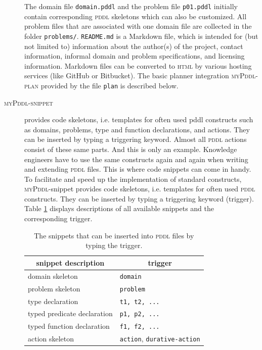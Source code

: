 \documentclass[runningheads]{llncs}
\newcommand{\tableheadline}[1]{\multicolumn{1}{c}{#1}}
\newcommand{\mypddl}{\textsc{myPddl}\xspace}
\newcommand{\mypddlsnippet}{\textsc{myPddl-snippet}\xspace}
\newcommand{\mypddlplan}{\textsc{myPddl-plan}\xspace}
\newcommand{\pddl}{\textsc{pddl}\xspace}
\begin{document}
\begin{description}
\begin{figure}[h] 
\end{figure}

The domain file \texttt{domain.pddl} and the problem file
\texttt{p01.pddl} initially contain corresponding \pddl skeletons
which can also be customized. All problem files that are associated
with one domain file are collected in the folder
\texttt{problems/}. \texttt{README.md} is a Markdown file, which is
intended for (but not limited to) information about the author(s) of
the project, contact information, informal domain and problem
specifications, and licensing information.  Markdown files can be
converted to \textsc{html} by various hosting services (like GitHub or
Bitbucket). The basic planner integration \mypddlplan provided by the
file \texttt{plan} is described below.

\item[\mypddlsnippet] provides code skeletons, i.e. templates for
  often used pddl constructs such as domains, problems, type and
  function declarations, and actions. They can be inserted by typing a
  triggering keyword. Almost all \pddl actions consist of these same parts. And this is only
an example. Knowledge engineers have to use the same constructs again
and again when writing and extending \pddl files. This is where code
snippets can come in handy. To facilitate and speed up the implementation of
standard constructs, \mypddl-snippet provides code skeletons, i.e.
templates for often used \pddl constructs. They can be inserted by
typing a triggering keyword (trigger). Table \ref{tab:snippets}
displays descriptions of all available snippets and the corresponding
trigger.

\begin{table}[htb]
\centering
\begin{tabular}{ll}
  \tableheadline{snippet description} & \tableheadline{trigger}                   \\
  \hline
  domain skeleton                     & \texttt{domain}                           \\
  problem skeleton                    & \texttt{problem}                          \\
  type declaration                    & \texttt{t1, t2, ...}                      \\
  typed predicate declaration         & \texttt{p1, p2, ...}                     \\ 
  typed function declaration          & \texttt{f1, f2, ...}                     \\
  action skeleton                     & \texttt{action}, \texttt{durative-action} \\
\end{tabular}\caption[Available snippets in \mypddl-snippet]{\label{tab:snippets}The snippets that can be inserted into \pddl files by typing the trigger.}


\end{table}
\end{description}
\end{document}
